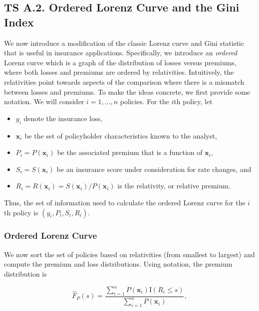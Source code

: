 \documentclass[]{book}
\providecommand{\tightlist}{%
  \setlength{\itemsep}{0pt}\setlength{\parskip}{0pt}}
\theoremstyle{definition}
\theoremstyle{definition}
\theoremstyle{definition}
\theoremstyle{remark}
\begin{document}
\subsection*{TS A.2. Ordered Lorenz Curve and the Gini
Index}\label{ts-a.2.-ordered-lorenz-curve-and-the-gini-index}

We now introduce a modification of the classic Lorenz curve and Gini
statistic that is useful in insurance applications. Specifically, we
introduce an \emph{ordered} Lorenz curve which is a graph of the
distribution of losses versus premiums, where both losses and premiums
are ordered by relativities. Intuitively, the relativities point towards
aspects of the comparison where there is a mismatch between losses and
premiums. To make the ideas concrete, we first provide some notation. We
will consider \(i=1, \ldots, n\) policies. For the \(i\)th policy, let

\begin{itemize}
\tightlist
\item
  \(y_i\) denote the insurance loss,
\item
  \(\mathbf{x}_i\) be the set of policyholder characteristics known to
  the analyst,
\item
  \(P_i=P(\mathbf{x}_i)\) be the associated premium that is a function
  of \(\mathbf{x}_i\),
\item
  \(S_i = S(\mathbf{x}_i)\) be an insurance score under consideration
  for rate changes, and
\item
  \(R_i = R(\mathbf{x}_i)=S(\mathbf{x}_i)/P(\mathbf{x}_i)\) is the
  relativity, or relative premium.
\end{itemize}

Thus, the set of information used to calculate the ordered Lorenz curve
for the \(i\)th policy is \((y_i, P_i, S_i, R_i)\).

\subsubsection*{Ordered Lorenz Curve}\label{ordered-lorenz-curve}

We now sort the set of policies based on relativities (from smallest to
largest) and compute the premium and loss distributions. Using notation,
the premium distribution is

\begin{equation}
\hat{F}_P(s) =  \frac{ \sum_{i=1}^n
P(\mathbf{x}_i) \mathrm{I}(R_i \leq s) }{\sum_{i=1}^n P(\mathbf{x}_i)} ,\label{eq:EmpPremDF}
\end{equation}
\end{document}
